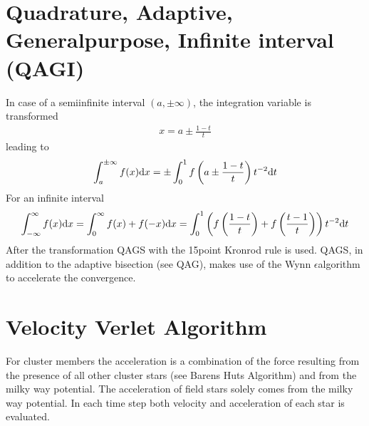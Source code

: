 \documentclass[letterpaper,10pt,english]{sphinxmanual}
\begin{document}
\section{Quadrature, Adaptive, General\sphinxhyphen{}purpose, Infinite interval (QAGI)}
\label{\detokenize{NBodySimulation/Integration:quadrature-adaptive-general-purpose-infinite-interval-qagi}}
\sphinxAtStartPar
In case of a semi\sphinxhyphen{}infinite interval \((a,\pm \infty)\), the integration variable is transformed
\begin{equation*}
\begin{split}x = a\pm\frac{1-t}{t}\end{split}
\end{equation*}
\sphinxAtStartPar
leading to
\begin{equation*}
\begin{split}\int_a^{\pm \infty}f(x)\textup{d}x = \pm \int_0^1 f \left(a\pm\frac{1-t}{t}\right)t^{-2}\textup{d}t\end{split}
\end{equation*}
\sphinxAtStartPar
For an infinite interval
\begin{equation*}
\begin{split}\int_{-\infty}^{\infty}f(x)\textup{d}x =
\int_0^\infty f(x)+f(-x)\textup{d}x =
\int_0^1  \left ( f \left(\frac{1-t}{t}\right) + f \left(\frac{t-1}{t}\right) \right )  t^{-2}\textup{d}t\end{split}
\end{equation*}
\sphinxAtStartPar
After the transformation QAGS with the 15\sphinxhyphen{}point Kronrod rule is used.
QAGS, in addition to the adaptive bisection (see QAG), makes use of the Wynn \(\epsilon\)\sphinxhyphen{}algorithm to accelerate the convergence.


\section{Velocity Verlet Algorithm}
\label{\detokenize{NBodySimulation/Integration:velocity-verlet-algorithm}}
\sphinxAtStartPar
For cluster members the acceleration is a combination of the force resulting from the presence of all other cluster stars (see Barens Huts Algorithm)
and from the milky way potential. The acceleration of field stars solely comes from the milky way potential.
In each time step both velocity and acceleration of each star is evaluated.
\end{document}
